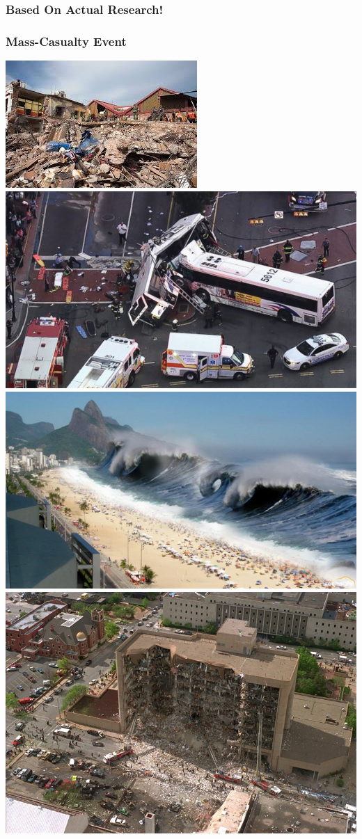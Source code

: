 \documentclass{beamer}
\begin{document}
\begin{frame}
\titlepage %
\end{frame}


%

\begin{frame}
  \frametitle{Based On Actual Research!}
\end{frame}

\begin{frame}
\frametitle{Mass-Casualty Event}
\includegraphics[width = .49\textwidth, height = .3\textwidth]{earthquake}
\includegraphics[width = .49\textwidth, height = .3\textwidth]{busaccident}
\includegraphics[width = .49\textwidth, height = .3\textwidth]{tsunami}
\includegraphics[width = .49\textwidth, height = .3\textwidth]{bombing}
\end{frame}
\end{document}
